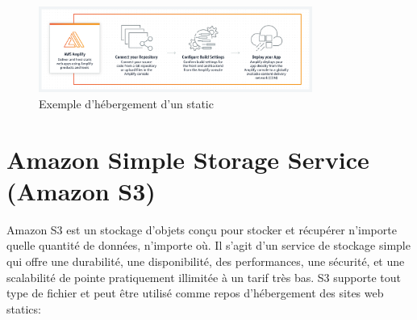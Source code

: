  \begin{figure}[!th]
            \centering
                \includegraphics[width=0.8\textwidth]{Figures/amplify_dif}
	       \decoRule
		\caption[Exemple d'hébergement d'un site static]{Exemple d'hébergement d'un static}
	\label{fig:amplify}
	\end{figure}

\section{Amazon Simple Storage Service (Amazon S3)}
Amazon S3 est un stockage d'objets conçu pour stocker et récupérer n'importe quelle quantité de données, n'importe où. Il s'agit d'un service de stockage simple qui offre une durabilité, une disponibilité, des performances, une sécurité, et une scalabilité de pointe pratiquement illimitée à un tarif très bas.
S3 supporte tout type de fichier et peut être utilisé comme repos d'hébergement des sites web statics:
